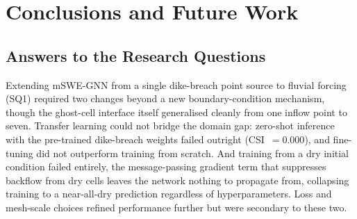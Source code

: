 \documentclass[12pt,a4paper]{report}
\begin{document}
{%
 
 
 
\chapter{Conclusions and Future Work}
\label{ch:conclusions}
 
\section{Answers to the Research Questions}
\label{sec:conclusions_rqs}
 
Extending mSWE-GNN from a single dike-breach point source to fluvial forcing (SQ1)
required two changes beyond a new boundary-condition mechanism, though the
ghost-cell interface itself generalised cleanly from one inflow point to seven.
Transfer learning could not bridge the domain gap: zero-shot inference with the
pre-trained dike-breach weights failed outright (CSI~$=0.000$), and fine-tuning did
not outperform training from scratch. And training from a dry initial condition
failed entirely, the message-passing gradient term that suppresses backflow from
dry cells leaves the network nothing to propagate from, collapsing training to a
near-all-dry prediction regardless of hyperparameters. Loss and mesh-scale choices
refined performance further but were secondary to these two.
 
}
\end{document}

